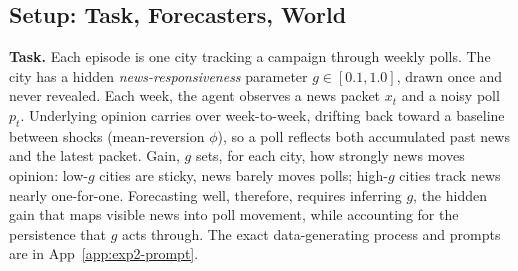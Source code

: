\documentclass{article} %
\begin{document}
\begin{figure}
{}
\label{fig:exp2}
\vspace{-2em}
\end{figure}



\subsection{Setup: Task, Forecasters, World}
\label{sec:exp2-setup}

\textbf{Task.}
Each episode is one city tracking a campaign through weekly polls. The city has a hidden \emph{news-responsiveness} parameter \(g\in[0.1,1.0]\), drawn once and never revealed. Each week, the agent observes a news packet \(x_t\) and a noisy poll \(p_t\). Underlying opinion carries over week-to-week, drifting back toward a baseline between shocks (mean-reversion \(\phi\)), so a poll reflects both accumulated past news and the latest packet. Gain, \(g\) sets, for each city, how strongly news moves opinion: low-\(g\) cities are sticky, news barely moves polls; high-\(g\) cities track news nearly one-for-one. Forecasting well, therefore, requires inferring \(g\), the hidden gain that maps visible news into poll movement, while accounting for the persistence that \(g\) acts through. The exact data-generating process and prompts are in App~\ref{app:exp2-prompt}.
\end{document}
